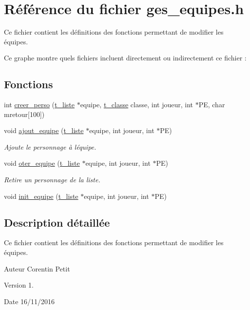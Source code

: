 \hypertarget{a00019}{}\section{Référence du fichier ges\+\_\+equipes.\+h}
\label{a00019}


Ce fichier contient les définitions des fonctions permettant de modifier les équipes.  


Ce graphe montre quels fichiers incluent directement ou indirectement ce fichier \+:
\subsection*{Fonctions}
\begin{DoxyCompactItemize}
\item 
int \hyperlink{a00019_a42ff9f274eeb473990113c520bfa6732}{creer\+\_\+perso} (\hyperlink{a00007}{t\+\_\+liste} $\ast$equipe, \hyperlink{a00005}{t\+\_\+classe} classe, int joueur, int $\ast$PE, char mretour\mbox{[}100\mbox{]})
\item 
void \hyperlink{a00019_a1417452b3b7f0d8a6332115396c9a4ac}{ajout\+\_\+equipe} (\hyperlink{a00007}{t\+\_\+liste} $\ast$equipe, int joueur, int $\ast$PE)
\begin{DoxyCompactList}\small\item\em Ajoute le personnage à l\textquotesingle{}équipe. \end{DoxyCompactList}\item 
void \hyperlink{a00019_ab9f551732a91b86d6807d7df5530967e}{oter\+\_\+equipe} (\hyperlink{a00007}{t\+\_\+liste} $\ast$equipe, int joueur, int $\ast$PE)
\begin{DoxyCompactList}\small\item\em Retire un personnage de la liste. \end{DoxyCompactList}\item 
void \hyperlink{a00019_a13288c98091fa36fe74b412dee64918f}{init\+\_\+equipe} (\hyperlink{a00007}{t\+\_\+liste} $\ast$equipe, int joueur, int $\ast$PE)
\end{DoxyCompactItemize}


\subsection{Description détaillée}
Ce fichier contient les définitions des fonctions permettant de modifier les équipes. 

\begin{DoxyAuthor}{Auteur}
Corentin Petit 
\end{DoxyAuthor}
\begin{DoxyVersion}{Version}
1. 
\end{DoxyVersion}
\begin{DoxyDate}{Date}
16/11/2016 
\end{DoxyDate}


